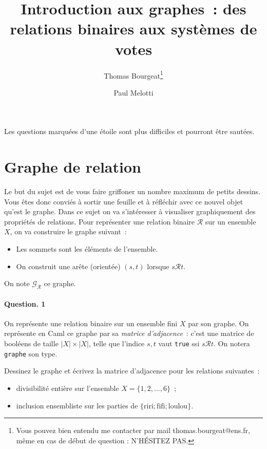 \documentclass[10pt,a4paper]{article}
\begin{document}
\title{Introduction aux graphes~: des relations binaires aux systèmes de votes}
\author{Thomas Bourgeat\footnote{Vous pouvez bien entendu me contacter par mail thomas.bourgeat@ens.fr, même en cas de début de question : N'HÉSITEZ PAS.}\and Paul Melotti}
\maketitle{}

Les questions marquées d'une étoile sont plus difficiles et pourront être sautées.

\section{Graphe de relation}

Le but du sujet est de vous faire griffoner un nombre maximum de petits
dessins. Vous êtes donc conviés à sortir une feuille et à réfléchir avec
ce nouvel objet qu'est le graphe. 
Dans ce sujet on va s'intéresser à visualiser graphiquement des
propriétés de relations. Pour représenter une relation binaire $\mathcal{R}$ sur un ensemble
$X$, on va construire le graphe suivant~: 
\begin{itemize}
\item Les sommets sont les éléments de l'ensemble.
\item On construit une arête (orientée) $(s,t)$ lorsque $s \mathcal{R} t$.
\end{itemize}
On note $\mathcal{G}_{\mathcal{R}}$ ce graphe.
\paragraph{Question. 1\\}
On représente une relation binaire sur un ensemble fini $X$ par son graphe.
On représente en Caml ce graphe par sa
\textit{matrice d'adjacence}~: c'est une matrice de booléens de taille 
$|X| \times |X|$, telle que l'indice $s,t$ vaut \texttt{true} ssi 
$s\mathcal{R} t$. On notera \texttt{graphe} son type.

Dessinez le graphe et écrivez la matrice d'adjacence pour les relations 
suivantes~:
\begin{itemize}
\item divisibilité entière sur l'ensemble $X=\{1,2,\dots,6\}$~;
\item inclusion ensembliste sur les parties de $\{\mathrm{riri};\mathrm{fifi};
\mathrm{loulou}\}$.
\end{itemize}
\end{document}
